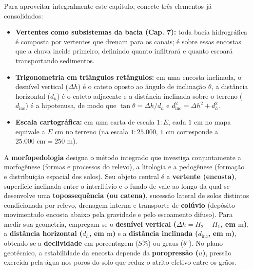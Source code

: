 \begin{capRevisao}
Para aproveitar integralmente este capítulo, conecte três elementos já consolidados:
\begin{itemize}[leftmargin=1.5em, itemsep=2pt]
  \item \textbf{Vertentes como subsistemas da bacia (Cap. 7):} toda bacia hidrográfica é composta por vertentes que drenam para os canais; é sobre essas encostas que a chuva incide primeiro, definindo quanto infiltrará e quanto escoará transportando sedimentos.
  \item \textbf{Trigonometria em triângulos retângulos:} em uma encosta inclinada, o desnível vertical ($\Delta h$) é o cateto oposto ao ângulo de inclinação $\theta$, a distância horizontal ($d_h$) é o cateto adjacente e a distância inclinada sobre o terreno ($d_{\text{inc}}$) é a hipotenusa, de modo que $\tan\theta = \Delta h / d_h$ e $d_{\text{inc}}^2 = \Delta h^2 + d_h^2$.
  \item \textbf{Escala cartográfica:} em uma carta de escala $1{:}E$, cada $1\text{ cm}$ no mapa equivale a $E\text{ cm}$ no terreno (na escala $1{:}25.000$, $1\text{ cm}$ corresponde a $25.000\text{ cm} = 250\text{ m}$).
\end{itemize}
\end{capRevisao}


\begin{boxSimbolo}
A \textbf{morfopedologia} designa o método integrado que investiga conjuntamente a morfogênese (formas e processos do relevo), a litologia e a pedogênese (formação e distribuição espacial dos solos). Seu objeto central é a \textbf{vertente (encosta)}, superfície inclinada entre o interflúvio e o fundo de vale ao longo da qual se desenvolve uma \textbf{topossequência (ou catena)}, sucessão lateral de solos distintos condicionada por relevo, drenagem interna e transporte de \textbf{colúvio} (depósito movimentado encosta abaixo pela gravidade e pelo escoamento difuso). Para medir sua geometria, empregam-se o \textbf{desnível vertical ($\Delta h = H_2 - H_1$, em $\text{m}$)}, a \textbf{distância horizontal ($d_h$, em $\text{m}$)} e a \textbf{distância inclinada ($d_{\text{inc}}$, em $\text{m}$)}, obtendo-se a \textbf{declividade} em porcentagem ($S\%$) ou graus ($\theta^\circ$). No plano geotécnico, a estabilidade da encosta depende da \textbf{poropressão ($u$)}, pressão exercida pela água nos poros do solo que reduz o atrito efetivo entre os grãos.
\end{boxSimbolo}

